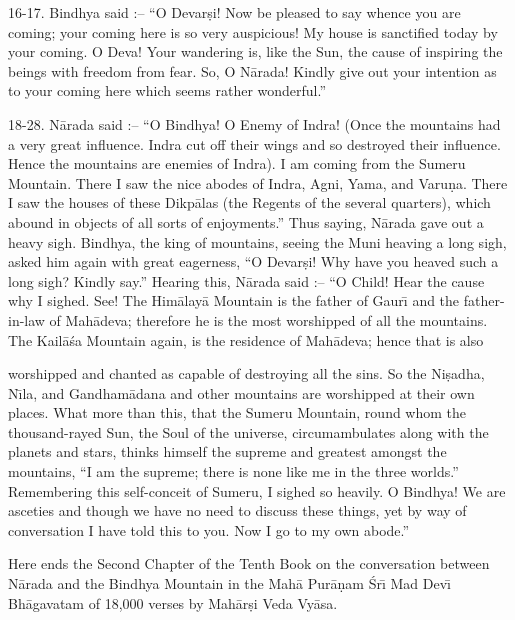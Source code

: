 16-17. Bindhya said :-- ``O Devar\d{s}i! Now be pleased to say whence you are coming; your coming here is so very auspicious! My house is sanctified today by your coming. O Deva! Your wandering is, like the Sun, the cause of inspiring the beings with freedom from fear. So, O N\=arada! Kindly give out your intention as to your coming here which seems rather wonderful.''

18-28. N\=arada said :-- ``O Bindhya! O Enemy of Indra! (Once the mountains had a very great influence. Indra cut off their wings and so destroyed their influence. Hence the mountains are enemies of Indra). I am coming from the Sumeru Mountain. There I saw the nice abodes of Indra, Agni, Yama, and Varu\d{n}a. There I saw the houses of these Dikp\=alas (the Regents of the several quarters), which abound in objects of all sorts of enjoyments.'' Thus saying, N\=arada gave out a heavy sigh. Bindhya, the king of mountains, seeing the Muni heaving a long sigh, asked him again with great eagerness, ``O Devar\d{s}i! Why have you heaved such a long sigh? Kindly say.'' Hearing this, N\=arada said :-- ``O Child! Hear the cause why I sighed. See! The Him\=alay\=a Mountain is the father of Gaur\={\i} and the father-in-law of Mah\=adeva; therefore he is the most worshipped of all the mountains. The Kail\=a\'sa Mountain again, is the residence of Mah\=adeva; hence that is also

worshipped and chanted as capable of destroying all the sins. So the Ni\d{s}adha, N\={\i}la, and Gandham\=adana and other mountains are worshipped at their own places. What more than this, that the Sumeru Mountain, round whom the thousand-rayed Sun, the Soul of the universe, circumambulates along with the planets and stars, thinks himself the supreme and greatest amongst the mountains, ``I am the supreme; there is none like me in the three worlds.'' Remembering this self-conceit of Sumeru, I sighed so heavily. O Bindhya! We are asceties and though we have no need to discuss these things, yet by way of conversation I have told this to you. Now I go to my own abode.''

Here ends the Second Chapter of the Tenth Book on the conversation between N\=arada and the Bindhya Mountain in the Mah\=a Pur\=a\d{n}am \'Sr\={\i} Mad Dev\={\i} Bh\=agavatam of 18,000 verses by Mah\=ar\d{s}i Veda Vy\=asa.



